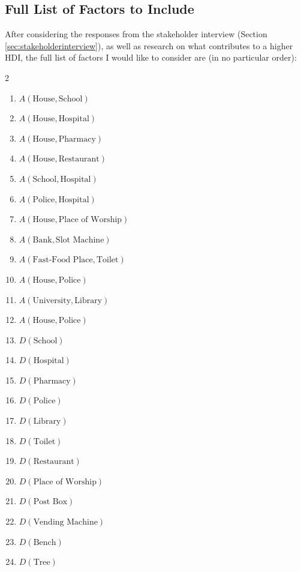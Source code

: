 \documentclass[12pt]{report}
\begin{document}
\subsection{Full List of Factors to Include}\label{sec:listOfFactors}
After considering the responses from the stakeholder interview (Section \ref{sec:stakeholderinterview}), as well as research on what contributes to a higher HDI, the full list of factors I would like to consider are (in no particular order):
\begin{multicols}{2}
\begin{enumerate}
    \item $A\left(\text{House},\text{School}\right)$
    \item $A\left(\text{House},\text{Hospital}\right)$
    \item $A\left(\text{House},\text{Pharmacy}\right)$
    \item $A\left(\text{House},\text{Restaurant}\right)$
    \item $A\left(\text{School},\text{Hospital}\right)$
    \item $A\left(\text{Police},\text{Hospital}\right)$
    \item $A\left(\text{House},\text{Place of Worship}\right)$
    \item $A\left(\text{Bank},\text{Slot Machine}\right)$
    \item $A\left(\text{Fast-Food Place},\text{Toilet}\right)$
    \item $A\left(\text{House},\text{Police}\right)$
    \item $A\left(\text{University},\text{Library}\right)$
    \item $A\left(\text{House},\text{Police}\right)$
    \item $D\left(\text{School}\right)$
    \item $D\left(\text{Hospital}\right)$
    \item $D\left(\text{Pharmacy}\right)$
    \item $D\left(\text{Police}\right)$
    \item $D\left(\text{Library}\right)$
    \item $D\left(\text{Toilet}\right)$
    \item $D\left(\text{Restaurant}\right)$
    \item $D\left(\text{Place of Worship}\right)$
    \item $D\left(\text{Post Box}\right)$
    \item $D\left(\text{Vending Machine}\right)$
    \item $D\left(\text{Bench}\right)$
    \item $D\left(\text{Tree}\right)$
\end{enumerate}
\end{multicols}
\end{document}
